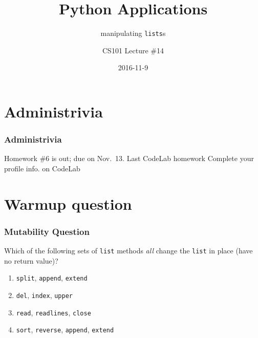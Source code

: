 \documentclass[11pt]{beamer}
\title{Python Applications}
\subtitle{manipulating \texttt{lists}s}
\author{CS101 Lecture \#14}
\date{2016-11-9}
\begin{document}
  \setcounter{showProgressBar}{0}
  \setcounter{showSlideNumbers}{0}

\frame{\titlepage}

\setcounter{framenumber}{0}
\setcounter{showProgressBar}{1}
\setcounter{showSlideNumbers}{1}

\section{Administrivia}

\begin{frame}
  \frametitle{Administrivia}
  \Enlarge

  \begin{itemize}
  \myitem  Homework \#6 is out; due on Nov.\ 13.
  \myitem Last CodeLab homework
  \myitem Complete your profile info. on CodeLab
  \end{itemize}
\end{frame}


\section{Warmup question}

\begin{frame}[fragile]
  \frametitle{Mutability Question}
  \Enlarge

  Which of the following sets of \texttt{list} methods \emph{all} change the \texttt{list} in place (have no return value)?

  \begin{enumerate}[label=\Alph*]
  \item  \texttt{split}, \texttt{append}, \texttt{extend}
  \item  \texttt{del}, \texttt{index}, \texttt{upper}
  \item  \texttt{read}, \texttt{readlines}, \texttt{close}
  \item  \texttt{sort}, \texttt{reverse}, \texttt{append}, \texttt{extend}
  \end{enumerate}
\end{frame}
\end{document}

